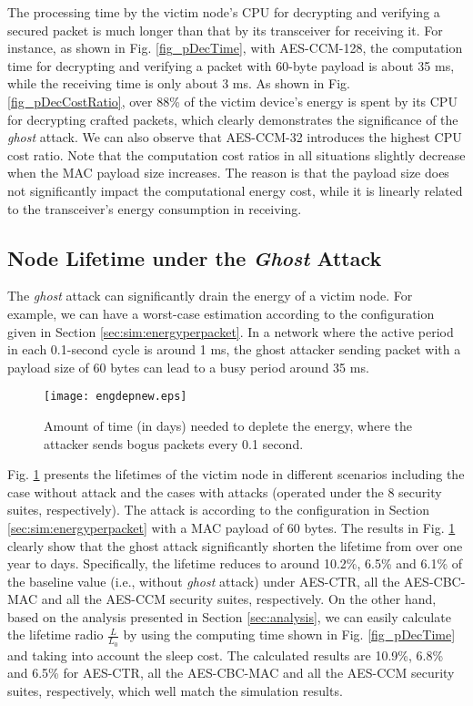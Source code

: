 \documentclass[10pt,journal,cspaper,compsoc]{IEEEtran}
\begin{document}
The processing time by the victim node's CPU for decrypting and verifying a secured packet is much longer than that by its transceiver for receiving it. For instance, as shown in Fig. \ref{fig_pDecTime}, with AES-CCM-128, the computation time for decrypting and verifying a packet with 60-byte payload is about 35 ms, while the receiving time is only about 3 ms. As shown in Fig. \ref{fig_pDecCostRatio}, over 88\% of the victim device's energy is spent by its CPU for decrypting crafted packets, which clearly demonstrates the significance of the {\em ghost} attack. We can also observe that AES-CCM-32 introduces the highest CPU cost ratio. Note that the computation cost ratios in all situations slightly decrease when the MAC payload size increases. The reason is that the payload size does not significantly impact the computational energy cost, while it is linearly related to the transceiver's energy consumption in receiving.


\subsection{Node Lifetime under the {\bf \em Ghost} Attack}\label{sec:sim:lifetime}
The {\em ghost} attack can significantly drain the energy of a victim node. For example, we can have a worst-case estimation according to the configuration given in Section \ref{sec:sim:energyperpacket}. In a network where the active period in each 0.1-second cycle is around 1 ms, the ghost attacker sending packet with a payload size of 60 bytes can lead to a busy period around 35 ms.

\begin{figure}[!ht]
\vspace{-2mm}
	\centering
	\texttt{[image: engdepnew.eps]}
	\caption{Amount of time (in days) needed to deplete the energy, where the attacker sends bogus packets every 0.1 second.}
	\label{fig_engdep}	
\end{figure}

Fig. \ref{fig_engdep} presents the lifetimes of the victim node in different scenarios including the case without attack and the cases with attacks (operated under the 8 security suites, respectively).  The attack is according to the configuration in Section \ref{sec:sim:energyperpacket} with a MAC payload of 60 bytes. The results in Fig. \ref{fig_engdep} clearly show that the ghost attack significantly shorten the lifetime from over one year to days. Specifically, the lifetime reduces to around 10.2\%, 6.5\% and 6.1\% of the baseline value (i.e., without {\em ghost} attack) under AES-CTR, all the AES-CBC-MAC and all the AES-CCM security suites, respectively. On the other hand, based on the analysis presented in Section \ref{sec:analysis}, we can easily calculate the lifetime radio $\frac{L}{L_0}$ by using the computing time shown in Fig. \ref{fig_pDecTime} and taking into account the sleep cost. The calculated results are 10.9\%, 6.8\% and 6.5\% for AES-CTR, all the AES-CBC-MAC and all the AES-CCM security suites, respectively, which well match the simulation results.
\end{document}
